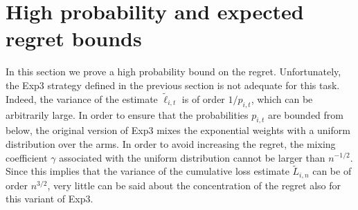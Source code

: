 \documentclass[11pt]{hackednow}
\renewcommand{\tilde}{\widetilde}
\begin{document}
\section{High probability and expected regret bounds} \label{sec:regret}
In this section we prove a high probability bound on the regret. Unfortunately, the Exp3 strategy defined in the previous section is not adequate for this task. Indeed, the variance of the estimate $\tilde{\ell}_{i,t}$ is of order $1/p_{i,t}$, which can be arbitrarily large. In order to ensure that the probabilities $p_{i,t}$ are bounded from below, the original version of Exp3 mixes the exponential weights with a uniform distribution over the arms. In order to avoid increasing the regret, the mixing coefficient $\gamma$ associated with the uniform distribution cannot be larger than $n^{-1/2}$. Since this implies that the variance of the cumulative loss estimate $\tilde{L}_{i,n}$ can be of order $n^{3/2}$, very little can be said about the concentration of the regret also for this variant of Exp3.
\end{document}
